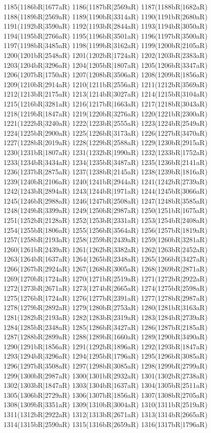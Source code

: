 1185(1186bR|1677aR) 1186(1187bR|2569aR) 1187(1188bR|1682aR) \\1188(1189bR|2569aR) 1189(1190bR|3314aR) 1190(1191bR|2680aR) 1191(1192bR|3590aR) 1192(1193bR|2844aR) 1193(1194bR|3050aR) 1194(1195bR|2766aR) 1195(1196bR|3501aR) 1196(1197bR|3500aR) \\1197(1198bR|3485aR) 1198(1199bR|3162aR) 1199(1200bR|2105aR) 1200(1201bR|2548aR) 1201(1202bR|1724aR) 1202(1203bR|2383aR) 1203(1204bR|3296aR) 1204(1205bR|1807aR) 1205(1206bR|3347aR) \\1206(1207bR|1750aR) 1207(1208bR|3506aR) 1208(1209bR|1856aR) 1209(1210bR|2914aR) 1210(1211bR|2556aR) 1211(1212bR|3569aR) 1212(1213bR|2175aR) 1213(1214bR|3027aR) 1214(1215bR|3104aR) \\1215(1216bR|3281aR) 1216(1217bR|1663aR) 1217(1218bR|3043aR) 1218(1219bR|1847aR) 1219(1220bR|3276aR) 1220(1221bR|2300aR) 1221(1222bR|3240aR) 1222(1223bR|2555aR) 1223(1224bR|2549aR) \\1224(1225bR|2900aR) 1225(1226bR|3173aR) 1226(1227bR|3470aR) 1227(1228bR|2019aR) 1228(1229bR|2588aR) 1229(1230bR|2915aR) 1230(1231bR|1807aR) 1231(1232bR|1990aR) 1232(1233bR|1752aR) \\1233(1234bR|3434aR) 1234(1235bR|3487aR) 1235(1236bR|2141aR) 1236(1237bR|2875aR) 1237(1238bR|2145aR) 1238(1239bR|1816aR) 1239(1240bR|2106aR) 1240(1241bR|2944aR) 1241(1242bR|2739aR) \\1242(1243bR|2894aR) 1243(1244bR|1971aR) 1244(1245bR|3066aR) 1245(1246bR|2988aR) 1246(1247bR|2508aR) 1247(1248bR|3585aR) 1248(1249bR|3399aR) 1249(1250bR|2987aR) 1250(1251bR|1675aR) \\1251(1252bR|2128aR) 1252(1253bR|2331aR) 1253(1254bR|2408aR) 1254(1255bR|1806aR) 1255(1256bR|3564aR) 1256(1257bR|1819aR) 1257(1258bR|2193aR) 1258(1259bR|2439aR) 1259(1260bR|3281aR) \\1260(1261bR|2439aR) 1261(1262bR|3382aR) 1262(1263bR|2452aR) 1263(1264bR|1637aR) 1264(1265bR|2348aR) 1265(1266bR|3427aR) 1266(1267bR|2924aR) 1267(1268bR|3005aR) 1268(1269bR|2871aR) \\1269(1270bR|1724aR) 1270(1271bR|2519aR) 1271(1272bR|2922aR) 1272(1273bR|2671aR) 1273(1274bR|2665aR) 1274(1275bR|2598aR) 1275(1276bR|1724aR) 1276(1277bR|2391aR) 1277(1278bR|2987aR) \\1278(1279bR|2892aR) 1279(1280bR|2753aR) 1280(1281bR|3163aR) 1281(1282bR|2193aR) 1282(1283bR|2319aR) 1283(1284bR|2739aR) 1284(1285bR|2348aR) 1285(1286bR|3427aR) 1286(1287bR|2185aR) \\1287(1288bR|2899aR) 1288(1289bR|1660aR) 1289(1290bR|3490aR) 1290(1291bR|1856aR) 1291(1292bR|1896aR) 1292(1293bR|1847aR) 1293(1294bR|3296aR) 1294(1295bR|1796aR) 1295(1296bR|3085aR) \\1296(1297bR|3508aR) 1297(1298bR|3085aR) 1298(1299bR|2799aR) 1299(1300bR|2987aR) 1300(1301bR|2932aR) 1301(1302bR|2738aR) 1302(1303bR|1847aR) 1303(1304bR|1637aR) 1304(1305bR|2511aR) \\1305(1306bR|2729aR) 1306(1307bR|1856aR) 1307(1308bR|2705aR) 1308(1309bR|3351aR) 1309(1310bR|3004aR) 1310(1311bR|2519aR) 1311(1312bR|2922aR) 1312(1313bR|2671aR) 1313(1314bR|2665aR) \\1314(1315bR|2590aR) 1315(1316bR|2659aR) 1316(1317bR|1796aR) 
